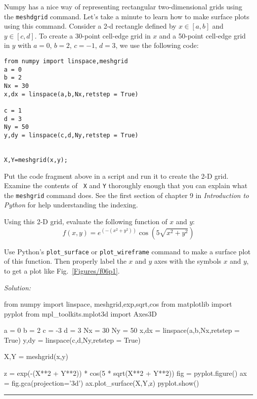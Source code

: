 \begin{enumerate}
\probtwo \label{P:15.1} Numpy has a nice way of representing
    rectangular two-dimensional grids using the {\tt meshdgrid}
    command. Let's take a minute to
    learn how to make surface plots using this command.
    Consider a 2-d rectangle defined by $x \in [a,b]$ and $y
    \in [c,d]$. To create a 30-point cell-edge grid in $x$ and
    a 50-point cell-edge grid in $y$ with $a=0$, $b=2$, $c=-1$,
    $d=3$, we use the following code:
\begin{Verbatim}
from numpy import linspace,meshgrid
a = 0
b = 2
Nx = 30
x,dx = linspace(a,b,Nx,retstep = True)

c = 1
d = 3
Ny = 50
y,dy = linspace(c,d,Ny,retstep = True)


X,Y=meshgrid(x,y);
\end{Verbatim}
    \begin{enumerate}

\subprob Put the code fragment above in a script and run
    it to create the 2-D grid. Examine the contents of {\tt
    X} and {\tt Y} thoroughly enough that you can explain
    what the {\tt meshgrid} command does.  See the first
    section of chapter 9 in \emph{Introduction to Python}
    for help understanding the indexing.


\subprob Using this 2-D grid, evaluate the following function
    of $x$ and $y$:
    \begin{equation}
        f(x,y) = e^{(-(x^2+y^2))} \cos{(5 \sqrt{x^2+y^2})}
    \end{equation}

    Use Python's \texttt{plot\_surface} or \texttt{plot\_wireframe}
    command to make a surface plot of this function.  Then properly label the $x$ and $y$
    axes with the symbols $x$ and $y$, to get a plot like
    Fig.~\ref{Figures/f06p1}.
\end{enumerate}
\end{enumerate}
\ifsolutions
\textit{Solution:}\\
\begin{codeexample}
\begin{VerbatimOut}{\listingFile}
from numpy import linspace, meshgrid,exp,sqrt,cos
from matplotlib import pyplot
from mpl_toolkits.mplot3d import Axes3D

a = 0
b = 2
c = -3
d = 3
Nx = 30
Ny = 50
x,dx = linspace(a,b,Nx,retstep = True)
y,dy = linspace(c,d,Ny,retstep = True)

X,Y = meshgrid(x,y)

z = exp(-(X**2 + Y**2)) * cos(5 * sqrt(X**2 + Y**2))
fig = pyplot.figure()
ax = fig.gca(projection='3d')
ax.plot_surface(X,Y,z)
pyplot.show()
\end{VerbatimOut}
\end{codeexample}
\else
\noindent\rule{5 in}{0.01 in}
\fi


